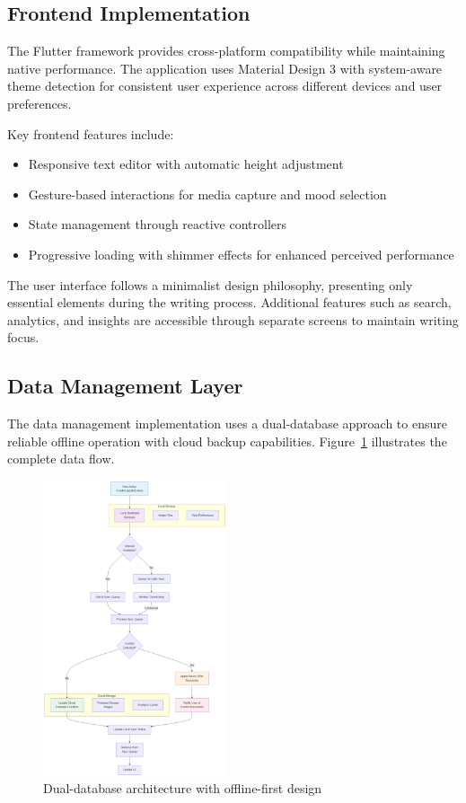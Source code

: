 \documentclass[conference]{IEEEtran}
\begin{document}
\subsection{Frontend Implementation}

The Flutter framework provides cross-platform compatibility while maintaining native performance. The application uses Material Design 3 with system-aware theme detection for consistent user experience across different devices and user preferences.

Key frontend features include:
\begin{itemize}
\item Responsive text editor with automatic height adjustment
\item Gesture-based interactions for media capture and mood selection
\item State management through reactive controllers
\item Progressive loading with shimmer effects for enhanced perceived performance
\end{itemize}

The user interface follows a minimalist design philosophy, presenting only essential elements during the writing process. Additional features such as search, analytics, and insights are accessible through separate screens to maintain writing focus.

\subsection{Data Management Layer}

The data management implementation uses a dual-database approach to ensure reliable offline operation with cloud backup capabilities. Figure~\ref{fig:data-architecture} illustrates the complete data flow.

\begin{figure}[h]
\centering
\includegraphics[width=0.48\textwidth]{../THESIS-WRITING/files/imgs/mermaid_diagram.png}
\caption{Dual-database architecture with offline-first design}
\label{fig:data-architecture}
\end{figure}
\end{document}
